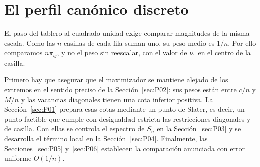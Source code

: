 \section{El perfil canónico discreto}\label{sec:perfil}

El paso del tablero al cuadrado unidad exige comparar magnitudes de la misma escala.
Como las $n$ casillas de cada fila suman uno, su peso medio es $1/n$. Por ello comparamos
$n\pi_{ij}$, y no el peso sin reescalar, con el valor de $\nu_1$ en el centro de la casilla.

Primero hay que asegurar que el maximizador se mantiene alejado de los extremos en el sentido
preciso de la Sección~\ref{sec:P02}: sus pesos están entre $c/n$ y $M/n$ y las vacancias
diagonales tienen una cota inferior positiva. La Sección~\ref{sec:P01} prepara esas cotas
mediante un punto de Slater, es decir, un punto factible que cumple con desigualdad estricta las
restricciones diagonales y de casilla.
Con ellas se controla el espectro de $S_n$ en la Sección~\ref{sec:P03} y se desarrolla el
término local en la Sección~\ref{sec:P04}. Finalmente, las Secciones~\ref{sec:P05}
y~\ref{sec:P06} establecen la comparación anunciada con error uniforme $O(1/n)$.
